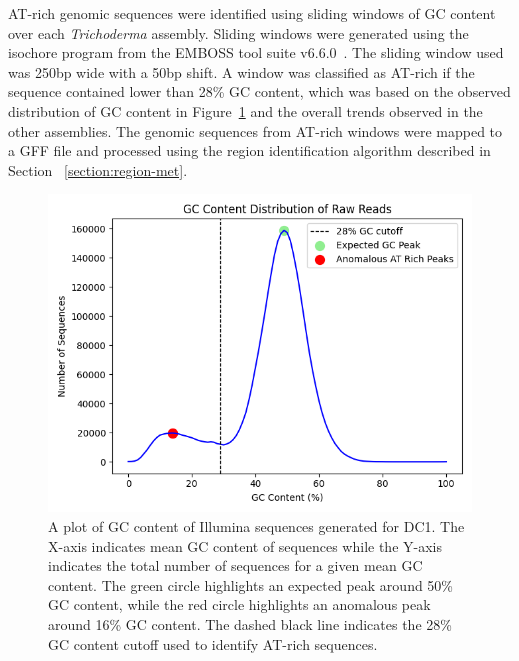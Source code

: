 AT-rich genomic sequences were identified using sliding windows of GC
content over each \textit{Trichoderma} assembly. Sliding windows were
generated using the isochore program from the EMBOSS tool suite
v6.6.0~\cite{rice2000a}. The sliding window used was 250bp wide with a
50bp shift. A window was classified as AT-rich if the sequence
contained lower than 28\% GC content, which was based on the observed distribution of GC content in Figure~\ref{fig:dc1-low-gc} and the overall trends observed in the other assemblies. The genomic sequences from
AT-rich windows were mapped to a GFF file and processed using the
region identification algorithm described in Section
~\ref{section:region-met}.

\begin{figure}
  \centering
  \includegraphics[width=\textwidth]{figures/raw-dc1-gc-plot.png}
  \caption[GC content distribution for DC1]{A plot of GC content of Illumina sequences generated for
    DC1. The X-axis indicates mean GC content of sequences while the
    Y-axis indicates the total number of sequences for a given mean GC
    content. The green circle highlights an expected peak around 50\% GC content, while the red circle highlights an anomalous peak around 16\% GC content. The dashed black line indicates the 28\% GC content cutoff used to identify AT-rich sequences.}\label{fig:dc1-low-gc}
\end{figure}




